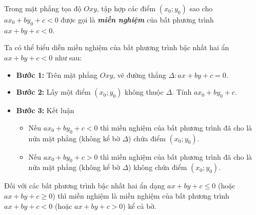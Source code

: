 \vspace{0.5cm}
\begin{kttrongtam}
	Trong mặt phẳng tọa độ $Oxy$, tập hợp các điểm $(x_0;y_0)$ sao cho $ax_0+by_0+c<0$ được gọi là \textbf{\textit{miền nghiệm}} của bất phương trình $ax+by+c<0$.
\end{kttrongtam}
Ta có thể biểu diễn miền nghiệm của bất phương trình bậc nhất hai ẩn $ax+by+c<0$ như sau:
\begin{itemize}
	\item \textbf{Bước 1:} Trên mặt phẳng $Oxy$, vẽ đường thẳng $\Delta\colon ax+by+c=0$.
	\item \textbf{Bước 2:} Lấy một điểm $(x_0;y_0)$ không thuộc $\Delta$. Tính $ax_0+by_0+c$.
	\item \textbf{Bước 3:} Kết luận
	\begin{itemize}
		\item Nếu $ax_0+by_0+c<0$ thì miền nghiệm của bất phương trình đã cho là nửa mặt phẳng (không kể bờ $\Delta$) chứa điểm $(x_0;y_0)$.
		\item Nếu $ax_0+by_0+c>0$ thì miền nghiệm của bất phương trình đã cho là nửa mặt phẳng (không kể bờ $\Delta$) không chứa điểm $(x_0;y_0)$.
	\end{itemize}
\end{itemize}

\begin{note}
	Đối với các bất phương trình bậc nhất hai ẩn dạng $ax+by+c \le 0$ (hoặc $ax+by+c \ge 0$) thì miền nghiệm là miền nghiệm của bất phương trình $ax+by+c < 0$ (hoặc $ax+by+c > 0$) kể cả bờ.
\end{note}

